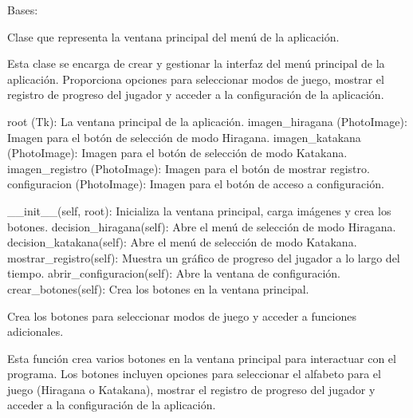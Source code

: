 \documentclass[letterpaper,10pt,spanish]{sphinxmanual}
\begin{document}
\begin{fulllineitems}
\label{\detokenize{main:main.MenuPrincipal}}
\pysigstartsignatures
{}
\pysigstopsignatures
\sphinxAtStartPar
Bases: 

\sphinxAtStartPar
Clase que representa la ventana principal del menú de la aplicación.

\sphinxAtStartPar
Esta clase se encarga de crear y gestionar la interfaz del menú principal de la aplicación. Proporciona opciones
para seleccionar modos de juego, mostrar el registro de progreso del jugador y acceder a la configuración de la
aplicación.
\begin{description}
\sphinxAtStartPar
root (Tk): La ventana principal de la aplicación.
imagen\_hiragana (PhotoImage): Imagen para el botón de selección de modo Hiragana.
imagen\_katakana (PhotoImage): Imagen para el botón de selección de modo Katakana.
imagen\_registro (PhotoImage): Imagen para el botón de mostrar registro.
configuracion (PhotoImage): Imagen para el botón de acceso a configuración.

\sphinxAtStartPar
\_\_init\_\_(self, root): Inicializa la ventana principal, carga imágenes y crea los botones.
decision\_hiragana(self): Abre el menú de selección de modo Hiragana.
decision\_katakana(self): Abre el menú de selección de modo Katakana.
mostrar\_registro(self): Muestra un gráfico de progreso del jugador a lo largo del tiempo.
abrir\_configuracion(self): Abre la ventana de configuración.
crear\_botones(self): Crea los botones en la ventana principal.

\end{description}

\begin{fulllineitems}
\label{\detokenize{main:main.MenuPrincipal.crear_botones}}
\pysigstartsignatures
{}
\pysigstopsignatures
\sphinxAtStartPar
Crea los botones para seleccionar modos de juego y acceder a funciones adicionales.

\sphinxAtStartPar
Esta función crea varios botones en la ventana principal para interactuar con el programa. Los botones
incluyen opciones para seleccionar el alfabeto para el juego (Hiragana o Katakana), mostrar el registro de
progreso del jugador y acceder a la configuración de la aplicación.


\end{fulllineitems}
\end{fulllineitems}
\end{document}
